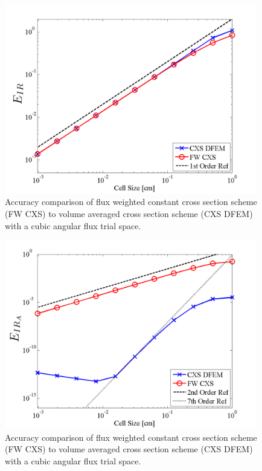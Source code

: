 %
%
\begin{figure}[!htp]
\centering
\includegraphics[width=11cm]{chapter3_variable_xs/FW_XS_P3_VarXS_E_I_L2.png}
\caption{Accuracy comparison of flux weighted constant cross section scheme (FW CXS) to volume averaged cross section  scheme (CXS DFEM) with a cubic angular flux trial space.}
\label{fig:fw_accuracy_ir}
\end{figure}
%
%
\begin{figure}[!hbp]
\centering
\includegraphics[width=11cm]{chapter3_variable_xs/FW_XS_P3_VarXS_E_I_A.png}
\caption{Accuracy comparison of flux weighted constant cross section scheme (FW CXS) to volume averaged cross section  scheme (CXS DFEM) with a cubic angular flux trial space.}
\label{fig:fw_accuracy_ir_a}
\end{figure}

